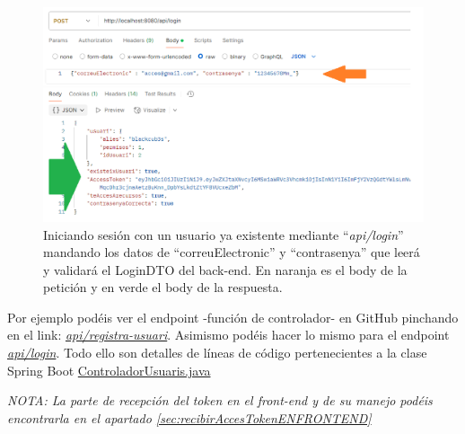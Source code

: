 \documentclass[a4paper,12pt]{report}
\begin{document}
		\setlength{\abovecaptionskip}{0pt}
		\FloatBarrier
		\begin{figure}[H]
			\centering
			\includegraphics[width=1\textwidth]{img/detallPostmanLogin.png}
			\caption{Iniciando sesión con un usuario ya existente mediante ``\textit{api/login}'' mandando los datos de ``correuElectronic'' y ``contrasenya'' que leerá y validará el LoginDTO del back-end. En naranja es el body de la petición y en verde el body de la respuesta.}
			
			\label{fig:detallPostmanLogin} 
		\end{figure}
		\FloatBarrier
		
		Por ejemplo podéis ver el endpoint -función de controlador- en GitHub pinchando en el link: \href{https://github.com/blackcub3s/mercApp/blob/78c9f573613d94a9d9de6ee046aa5d6f02f0f425/APP%20WEB/__springboot__produccio__/app/src/main/java/miApp/app/Usuaris/controlador/UsuariControlador.java#L119-L123}{\textit{api/registra-usuari}}. Asimismo podéis hacer lo mismo para el endpoint \href{https://github.com/blackcub3s/mercApp/blob/78c9f573613d94a9d9de6ee046aa5d6f02f0f425/APP%20WEB/__springboot__produccio__/app/src/main/java/miApp/app/Usuaris/controlador/UsuariControlador.java#L103-L107}{\textit{api/login}}. Todo ello son detalles de líneas de código pertenecientes a la clase Spring Boot \href{https://github.com/blackcub3s/mercApp/blob/main/APP%20WEB/__springboot__produccio__/app/src/main/java/miApp/app/Usuaris/controlador/UsuariControlador.java}{ControladorUsuaris.java}
	
		
		\textit{NOTA: La parte de recepción del token en el front-end y de su manejo podéis encontrarla en el apartado \ref{sec:recibirAccesTokenENFRONTEND}}

		
		
		
		
		
		
\end{document}
